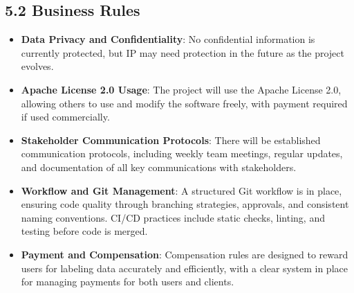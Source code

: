 \documentclass[12pt]{article}
\begin{document}
\subsection*{5.2 Business Rules}
\begin{itemize}[leftmargin=2cm]
    \item \textbf{Data Privacy and Confidentiality}: No confidential information is currently protected, but IP may need protection in the future as the project evolves.
    \item \textbf{Apache License 2.0 Usage}: The project will use the Apache License 2.0, allowing others to use and modify the software freely, with payment required if used commercially.
    \item \textbf{Stakeholder Communication Protocols}: There will be established communication protocols, including weekly team meetings, regular updates, and documentation of all key communications with stakeholders.
    \item \textbf{Workflow and Git Management}: A structured Git workflow is in place, ensuring code quality through branching strategies, approvals, and consistent naming conventions. CI/CD practices include static checks, linting, and testing before code is merged.
    \item \textbf{Payment and Compensation}: Compensation rules are designed to reward users for labeling data accurately and efficiently, with a clear system in place for managing payments for both users and clients.
\end{itemize}
\end{document}
